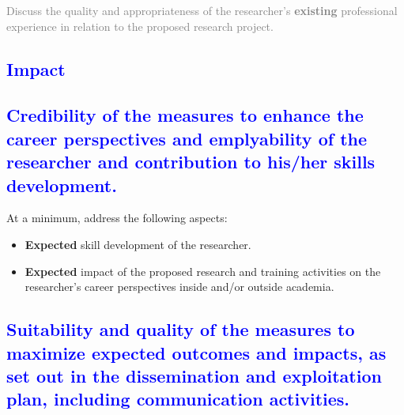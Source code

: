 \documentclass[11pt,a4paper]{article}
\begin{document}
\textcolor{gray}{Discuss the quality and appropriateness of the researcher's \textbf{existing} professional experience in relation to the proposed research project.}




\textcolor{Blue}{\section{Impact}}

\textcolor{Blue}{\subsection{Credibility of the measures to enhance the career perspectives and emplyability of the researcher and contribution to his/her skills development.}}

\color{gray}
At a minimum, address the following aspects:
\begin{itemize}
    \item \textbf{Expected} skill development of the researcher.
    \item \textbf{Expected} impact of the proposed research and training activities on the researcher's career perspectives inside and/or outside academia.
\end{itemize}
\color{black}


\textcolor{Blue}{\subsection{Suitability and quality of the measures to maximize expected outcomes and impacts, as set out in the dissemination and exploitation plan, including communication activities.}}
\end{document}
